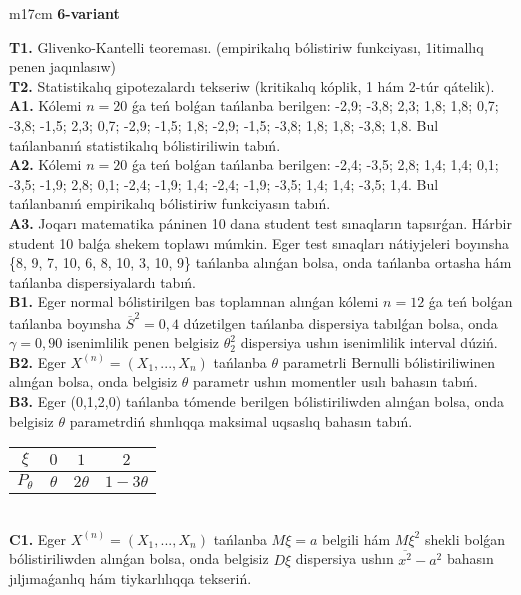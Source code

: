 \documentclass{article}
\begin{document}
\begin{tabular}{m{17cm}}
\textbf{6-variant}
\newline

\textbf{T1.} 
Glivenko-Kantelli teoreması. (empirikalıq bólistiriw funkciyası, 1itimallıq penen jaqınlasıw)
 \\
\textbf{T2.} 
Statistikalıq gipotezalardı tekseriw (kritikalıq kóplik, 1 hám 2-túr qátelik).
 \\
\textbf{A1.} 
Kólemi \(n = 20\) ǵa teń bolǵan tańlanba berilgen: -2,9; -3,8; 2,3; 1,8; 1,8; 0,7; -3,8; -1,5; 2,3; 0,7; -2,9; -1,5; 1,8; -2,9; -1,5; -3,8; 1,8; 1,8; -3,8; 1,8. Bul tańlanbanıń statistikalıq bólistiriliwin tabıń.
 \\
\textbf{A2.} 
Kólemi \(n = 20\) ǵa teń bolǵan tańlanba berilgen: -2,4; -3,5; 2,8; 1,4; 1,4; 0,1; -3,5; -1,9; 2,8; 0,1; -2,4; -1,9; 1,4; -2,4; -1,9; -3,5; 1,4; 1,4; -3,5; 1,4. Bul tańlanbanıń empirikalıq bólistiriw funkciyasın tabıń.
 \\
\textbf{A3.} 
Joqarı matematika páninen 10 dana student test sınaqların tapsırǵan. Hárbir student 10 balǵa shekem toplawı múmkin. Eger test sınaqları nátiyjeleri boyınsha \{8, 9, 7, 10, 6, 8, 10, 3, 10, 9\} tańlanba alınǵan bolsa, onda tańlanba ortasha hám tańlanba dispersiyalardı tabıń.
 \\
\textbf{B1.} 
Eger normal bólistirilgen bas toplamnan alınǵan kólemi \(n = 12\) ǵa teń bolǵan tańlanba boyınsha \({\overline{S}}^{2} = 0,4\) dúzetilgen tańlanba dispersiya tabılǵan bolsa, onda \(\gamma = 0,90\) isenimlilik penen belgisiz \(\theta_{2}^{2}\) dispersiya ushın isenimlilik interval dúziń.
 \\
\textbf{B2.} 
Eger \(X^{(n)} = \left( X_{1},...,X_{n} \right)\) tańlanba \(\theta\) parametrli Bernulli bólistiriliwinen alınǵan bolsa, onda belgisiz \(\theta\) parametr ushın momentler usılı bahasın tabıń.
 \\
\textbf{B3.} 
Eger (0,1,2,0) tańlanba tómende berilgen bólistiriliwden alınǵan bolsa, onda belgisiz \(\theta\) parametrdiń shınlıqqa maksimal uqsaslıq bahasın tabıń.
\begin{tabular}{|c|c|c|c|}
  \hline
$\xi$
&
$0$
&
$1$
&
$2$\\
\hline
\(P_{\theta}\) & \(\theta\) & \(2\theta\) & \(1 - 3\theta\) \\
\hline
\end{tabular}
 \\
\textbf{C1.} 
Eger \(X^{(n)} = \left( X_{1},...,X_{n} \right)\) tańlanba \(M\xi = a\) belgili hám \(M\xi^{2}\) shekli bolǵan bólistiriliwden alınǵan bolsa, onda belgisiz \(D\xi\) dispersiya ushın \(\overline{x^{2}} - a^{2}\) bahasın jıljımaǵanlıq hám tiykarlılıqqa tekseriń.

\end{tabular}
\end{document}
